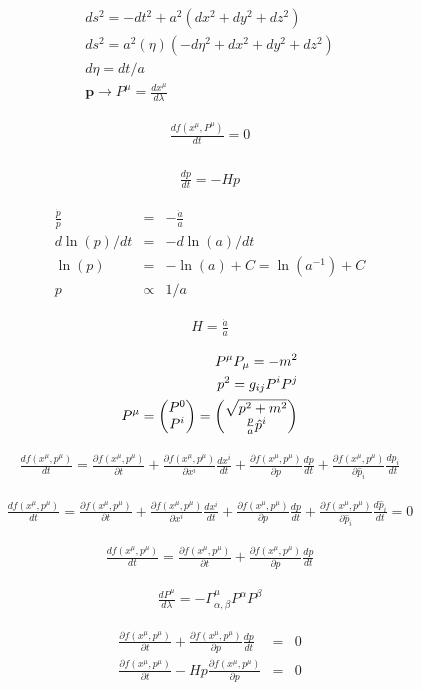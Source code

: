 \documentclass[a4paper, 11pt]{article}
\def\ba{\begin{eqnarray}}
\def\ea{\end{eqnarray}}
\begin{document}
\ba
ds^{2} = -dt^{2} + a^{2} (dx^{2} + dy^{2} + dz^{2}) \\
ds^{2} = a^{2}(\eta)(-d\eta^{2} + dx^{2} + dy^{2} + dz^{2}) \\
d\eta = dt/a \\
\bm{p} \longrightarrow P^{\mu} = \frac{dx^{\mu}}{d\lambda}
\ea

\ba
\frac{df(x^{\mu}, P^{\mu})}{dt}=0 \\
\ea

\ba
\frac{dp}{dt} = - Hp 
\ea

\ba
\frac{\dot{p}}{p} &=& - \frac{\dot{a}}{a} \\
d \ln(p)/dt &=& - d\ln(a)/dt \\
\ln(p)  &=&  -\ln(a) + C = \ln(a^{-1}) + C \\
p &\propto&  1/a
\ea

\ba
H = \frac{\dot{a}}{a}
\ea

\ba
P^{\mu} P_{\mu} = -m^{2} \\
p^{2} = g_{ij}P^{i}P^{j} \\
P^{\mu} =  \begin{pmatrix} 
P^{0}  \cr
P^{i} \cr
 \end{pmatrix} 
 =   \begin{pmatrix} 
 \sqrt{p^{2} + m^{2}} \cr
\frac{p}{a}\hat{p}^{i}\cr
 \end{pmatrix} 
\ea

\ba
\frac{df(x^{\mu}, p^{\mu})}{dt}= \frac{\partial f(x^{\mu}, p^{\mu})}{ \partial t} + \frac{\partial f(x^{\mu}, p^{\mu})}{ \partial x^{i}} \frac{dx^{i}}{dt} + \frac{\partial f(x^{\mu}, p^{\mu})}{ \partial p} \frac{dp}{dt} + \frac{\partial f(x^{\mu}, p^{\mu})}{ \partial \hat{p}_{i}} \frac{d\hat{p}_{i}}{dt}
\ea


\ba
\frac{df(x^{\mu}, p^{\mu})}{dt}= \frac{\partial f(x^{\mu}, p^{\mu})}{ \partial t} + \frac{\partial f(x^{\mu}, p^{\mu})}{ \partial x^{i}} \frac{dx^{i}}{dt} + \frac{\partial f(x^{\mu}, p^{\mu})}{ \partial p} \frac{dp}{dt} + \frac{\partial f(x^{\mu}, p^{\mu})}{ \partial \hat{p}_{i}} \frac{d\hat{p}_{i}}{dt} = 0
\ea

\ba
\frac{df(x^{\mu}, p^{\mu})}{dt}= \frac{\partial f(x^{\mu}, p^{\mu})}{ \partial t} + \frac{\partial f(x^{\mu}, p^{\mu})}{ \partial p} \frac{dp}{dt} 
\ea

\ba
\frac{dP^{\mu}}{d\lambda} = - \Gamma^{\mu}_{\alpha, \beta} P^{\alpha}P^{\beta}
\ea

\ba
 \frac{\partial f(x^{\mu}, p^{\mu})}{ \partial t} + \frac{\partial f(x^{\mu}, p^{\mu})}{ \partial p} \frac{dp}{dt}  &=& 0 \\
 \frac{\partial f(x^{\mu}, p^{\mu})}{ \partial t} - H p \frac{\partial f(x^{\mu}, p^{\mu})}{ \partial p} &=& 0
 \ea
\end{document}
